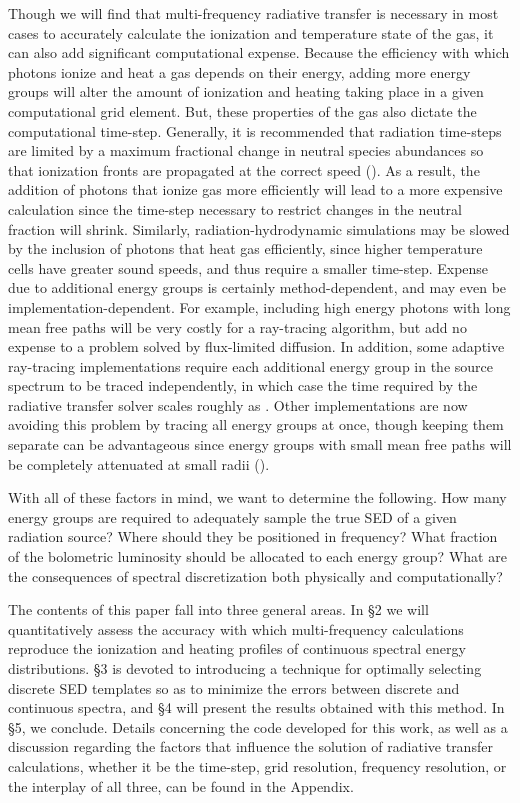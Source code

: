 \documentclass[preprint2]{aastex}              %
\begin{document}
Though we will find that multi-frequency radiative transfer is necessary in most cases to accurately calculate the ionization and temperature state of the gas, it can also add significant computational expense.  Because the efficiency with which photons ionize and heat a gas depends on their energy, adding more energy groups will alter the amount of ionization and heating taking place in a given computational grid element.  But, these properties of the gas also dictate the computational time-step.  Generally, it is recommended that radiation time-steps are limited by a maximum fractional change in neutral species abundances so that ionization fronts are propagated at the correct speed (\cite{Shapiro2004}).  As a result, the addition of photons that ionize gas more efficiently will lead to a more expensive calculation since the time-step necessary to restrict changes in the neutral fraction will shrink.  Similarly, radiation-hydrodynamic simulations may be slowed by the inclusion of photons that heat gas efficiently, since higher temperature cells have greater sound speeds, and thus require a smaller time-step.  Expense due to additional energy groups is certainly method-dependent, and may even be implementation-dependent.  For example, including high energy photons with long mean free paths will be very costly for a ray-tracing algorithm, but add no expense to a problem solved by flux-limited diffusion.  In addition, some adaptive ray-tracing implementations require each additional energy group in the source spectrum to be traced independently, in which case the time required by the radiative transfer solver scales roughly as \nnu.  Other implementations are now avoiding this problem by tracing all energy groups at once, though keeping them separate can be advantageous since energy groups with small mean free paths will be completely attenuated at small radii (\cite{Wise2011}).

With all of these factors in mind, we want to determine the following.  How many energy groups are required to adequately sample the true SED of a given radiation source?  Where should they be positioned in frequency?  What fraction of the bolometric luminosity should be allocated to each energy group?  What are the consequences of spectral discretization both physically and computationally?  

The contents of this paper fall into three general areas.  In \S2 we will quantitatively assess the accuracy with which multi-frequency calculations reproduce the ionization and heating profiles of continuous spectral energy distributions.  \S3 is devoted to introducing a technique for optimally selecting discrete SED templates so as to minimize the errors between discrete and continuous spectra, and \S4 will present the results obtained with this method.  In \S5, we conclude.  Details concerning the code developed for this work, as well as a discussion regarding the factors that influence the solution of radiative transfer calculations, whether it be the time-step, grid resolution, frequency resolution, or the interplay of all three, can be found in the Appendix.
\end{document}

